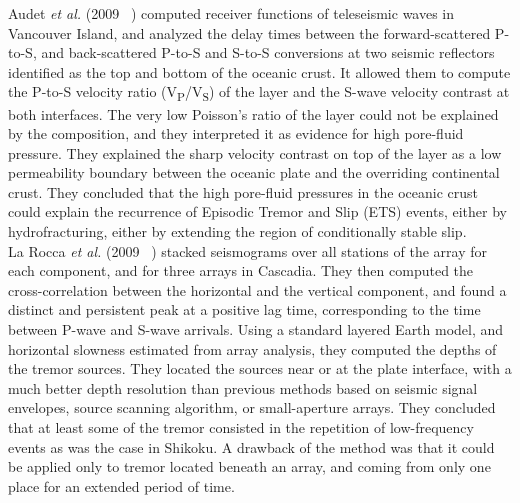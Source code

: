 \documentclass[main.tex]{subfiles}
\begin{document}
Audet \textit{et al.} (2009 ~\cite{AUD_2009}) computed receiver functions of teleseismic waves in Vancouver Island, and analyzed the delay times between the forward-scattered P-to-S, and back-scattered P-to-S and S-to-S conversions at two seismic reflectors identified as the top and bottom of the oceanic crust. It allowed them to compute the P-to-S velocity ratio (V\textsubscript{P}/V\textsubscript{S}) of the layer and the S-wave velocity contrast at both interfaces. The very low Poisson's ratio of the layer could not be explained by the composition, and they interpreted it as evidence for high pore-fluid pressure. They explained the sharp velocity contrast on top of the layer as a low permeability boundary between the oceanic plate and the overriding continental crust. They concluded that the high pore-fluid pressures in the oceanic crust could explain the recurrence of Episodic Tremor and Slip (ETS) events, either by hydrofracturing, either by extending the region of conditionally stable slip.\\

La Rocca \textit{et al.} (2009 ~\cite{LAR_2009}) stacked seismograms over all stations of the array for each component, and for three arrays in Cascadia. They then computed the cross-correlation between the horizontal and the vertical component, and found a distinct and persistent peak at a positive lag time, corresponding to the time between P-wave and S-wave arrivals. Using a standard layered Earth model, and horizontal slowness estimated from array analysis, they computed the depths of the tremor sources. They located the sources near or at the plate interface, with a much better depth resolution than previous methods based on seismic signal envelopes, source scanning algorithm, or small-aperture arrays. They concluded that at least some of the tremor consisted in the repetition of low-frequency events as was the case in Shikoku. A drawback of the method was that it could be applied only to tremor located beneath an array, and coming from only one place for an extended period of time. \\
\end{document}
